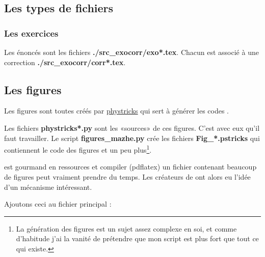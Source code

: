\subsection{Les types de fichiers}

\subsubsection{Les exercices}

Les énoncés sont les fichiers {\bf  ./src\_exocorr/exo*.tex}. Chacun est associé à une correction {\bf ./src\_exocorr/corr*.tex}.

\subsection{Les figures}

Les figures sont toutes créés par \href{https://github.com/LaurentClaessens/phystricks}{phystricks} qui sert à générer les codes \TikZ{}.

Les fichiers {\bf phystricks*.py} sont les «sources» de ces figures. C'est avec eux qu'il faut travailler. Le script {\bf figures\_mazhe.py} crée les fichiers {\bf Fig\_*.pstricks} qui contiennent le code \TikZ{} des figures et un peu plus\footnote{La génération des figures est un sujet assez complexe en soi, et comme d'habitude j'ai la vanité de prétendre que mon script est plus fort que tout ce qui existe.}.

\TikZ{} est gourmand en ressources et compiler (pdflatex) un fichier contenant beaucoup de figures \TikZ{} peut vraiment prendre du temps. Les créateurs de \TikZ{} ont alors eu l'idée d'un mécanisme intéressant. 

Ajoutons ceci au fichier principal :



